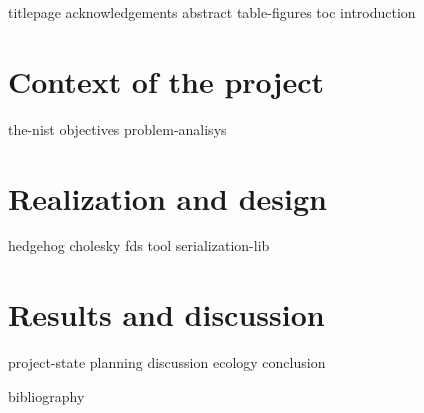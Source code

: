\documentclass[12pt]{article}
\begin{document}
    {titlepage}
    {acknowledgements}
    {abstract}
    {table-figures}
    {toc}
    {introduction}


    \clearpage{}
    \part{Context of the project}

    {the-nist}
    {objectives}
    {problem-analisys}

    \clearpage{}
    \part{Realization and design}

    {hedgehog}
    {cholesky}
    {fds}
    {tool}
    {serialization-lib}

    \clearpage{}
    \part{Results and discussion}

    {project-state}
    {planning}
    {discussion}
    {ecology}
    {conclusion}


    {bibliography}

    \clearpage{}
    \printglossaries

\end{document}
